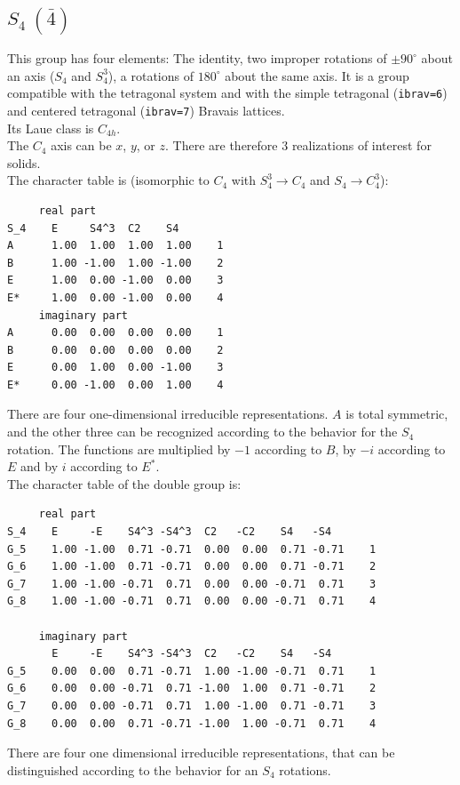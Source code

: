 \documentclass[12pt,a4paper]{article}
\begin{document}
\subsection{\color{web-blue}$S_4\ (\bar 4)$}  
This group has four elements: The identity, two improper rotations 
of $\pm90^\circ$ about an axis ($S_4$ and $S_4^3$),  
a rotations of $180^\circ$ about the same axis. 
It is a group compatible with the tetragonal system and with the  
simple tetragonal (\texttt{ibrav=6}) and centered tetragonal 
(\texttt{ibrav=7}) Bravais lattices. \\
Its Laue class is $C_{4h}$. \\
The $C_4$ axis can be $x$, $y$, or $z$. There are therefore $3$ realizations
of interest for solids. \\ 
The character table is (isomorphic to $C_4$ with $S_4^3 \rightarrow C_4$ and
$S_4 \rightarrow C_4^3$):
\begin{verbatim}
     real part
S_4    E     S4^3  C2    S4   
A      1.00  1.00  1.00  1.00    1
B      1.00 -1.00  1.00 -1.00    2
E      1.00  0.00 -1.00  0.00    3
E*     1.00  0.00 -1.00  0.00    4
     imaginary part
A      0.00  0.00  0.00  0.00    1
B      0.00  0.00  0.00  0.00    2
E      0.00  1.00  0.00 -1.00    3
E*     0.00 -1.00  0.00  1.00    4
\end{verbatim}
There are four one-dimensional irreducible representations. $A$ is total
symmetric, and the other three can be recognized according to the behavior
for the $S_4$ rotation. The functions are multiplied by $-1$ according to
$B$, by $-i$ according to $E$ and by $i$ according to $E^*$.\\
The character table of the double group is:
\begin{verbatim}
     real part
S_4    E     -E    S4^3 -S4^3  C2   -C2    S4   -S4  
G_5    1.00 -1.00  0.71 -0.71  0.00  0.00  0.71 -0.71    1
G_6    1.00 -1.00  0.71 -0.71  0.00  0.00  0.71 -0.71    2
G_7    1.00 -1.00 -0.71  0.71  0.00  0.00 -0.71  0.71    3
G_8    1.00 -1.00 -0.71  0.71  0.00  0.00 -0.71  0.71    4

     imaginary part
       E     -E    S4^3 -S4^3  C2   -C2    S4   -S4  
G_5    0.00  0.00  0.71 -0.71  1.00 -1.00 -0.71  0.71    1
G_6    0.00  0.00 -0.71  0.71 -1.00  1.00  0.71 -0.71    2
G_7    0.00  0.00 -0.71  0.71  1.00 -1.00  0.71 -0.71    3
G_8    0.00  0.00  0.71 -0.71 -1.00  1.00 -0.71  0.71    4
\end{verbatim}
There are four one dimensional irreducible representations, that can
be distinguished according to the behavior for an $S_4$ rotations.
\end{document}
